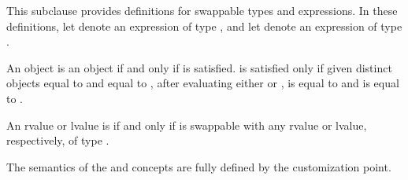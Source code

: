 \begin{addedblock}
{\color{oldclr}
\begin{itemdescr}
\pnum
This subclause provides definitions for swappable types and expressions.
In these definitions, let  denote an expression of type , and
let  denote an expression of type .

\pnum
An object  is  an object  if and only if
 is satisfied.  is
satisfied only if given distinct objects  equal to 
and  equal to , after evaluating either
 or ,  is equal to
 and  is equal to .

\pnum
An rvalue or lvalue  is  if and only if  is
swappable with any rvalue or lvalue, respectively, of type .
\end{itemdescr}
} %

{\color{newclr}
\pnum
\begin{note}
The semantics of the  and 
concepts are fully defined by the  customization point.
\end{note}
} %
\end{addedblock}

